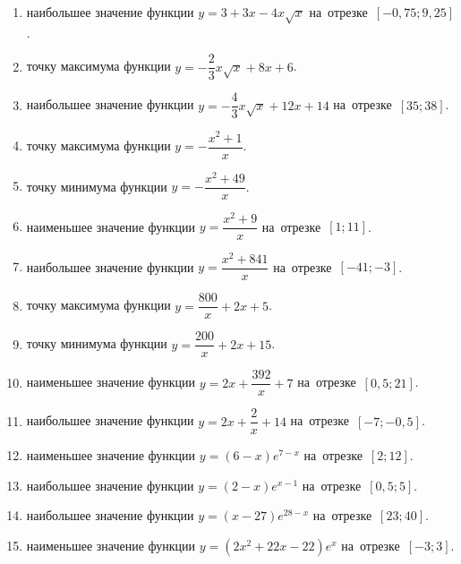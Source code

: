 \documentclass[a4paper,10pt]{article}
\begin{document}
\begin{enumerate}
\item {} наибольшее значение функции $y=3+3x -4x\sqrt{x}$ на~отрезке~$\left[-0,75;9,25\right]$.

\item {} точку максимума функции $y=-\dfrac{2}{3}x\sqrt{x} +8x+6$.

\item {} наибольшее значение функции $y=-\dfrac{4}{3}x\sqrt{x} +12x+14$ на~отрезке~$\left[35;38\right]$.

\item {} точку максимума функции $y=-\dfrac{x^2 +1}{x}$.

\item {} точку минимума функции $y=-\dfrac{x^2 +49}{x}$.

\item {} наименьшее значение функции $y=\dfrac{x^2 +9}{x}$ на~отрезке~$\left[1;11\right]$.

\item {} наибольшее значение функции $y=\dfrac{x^2 +841}{x}$ на~отрезке~$\left[-41;-3\right]$.

\item {} точку максимума функции $y=\dfrac{800}{x} +2x+5$.

\item {} точку минимума функции $y=\dfrac{200}{x} +2x+15$.

\item {} наименьшее значение функции $y=2x+\dfrac{392}{x} +7$ на~отрезке~$\left[0,5;21\right]$.

\item {} наибольшее значение функции $y=2x+\dfrac{2}{x} +14$ на~отрезке~$\left[-7;-0,5\right]$.

\item {} наименьшее значение функции $y=\left(6-x\right)e^{7-x}$ на~отрезке~$\left[2;12\right]$.

\item {} наибольшее значение функции $y=\left(2-x\right)e^{x-1}$ на~отрезке~$\left[0,5;5\right]$.

\item {} наибольшее значение функции $y=\left(x-27\right)e^{28-x}$ на~отрезке~$\left[23;40\right]$.

\item {} наименьшее значение функции $y=\left(2x^2 +22x -22\right)e^{x }$ на~отрезке~$\left[-3;3\right]$.


\end{enumerate}
\end{document}
